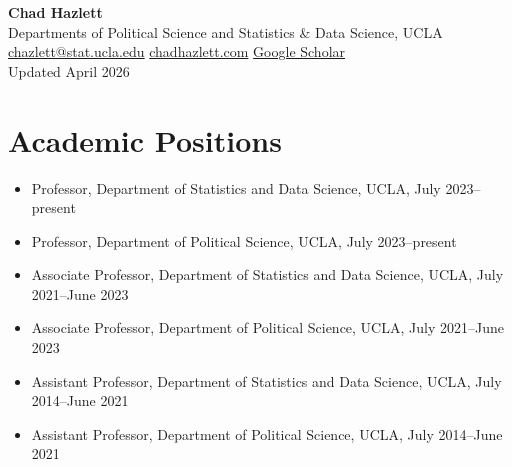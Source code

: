 \documentclass[11pt]{article}
\begin{document}
\begin{center}
  {\LARGE\sffamily\bfseries Chad Hazlett}\\[4pt]
  {\small Departments of Political Science and Statistics \& Data Science, UCLA}\\[3pt]
  {\small
    \href{mailto:chazlett@stat.ucla.edu}{chazlett@stat.ucla.edu}
    \quad\textbullet\quad
    \href{https://chadhazlett.com}{chadhazlett.com}
    \quad\textbullet\quad
    \href{https://scholar.google.com/citations?user=pbD0dGwAAAAJ}{Google Scholar}
  }\\[4pt]
  {\footnotesize\color{gray} Updated April 2026}
\end{center}

\vspace{0.5em}

\section{Academic Positions}
\begin{itemize}
\item Professor, Department of Statistics and Data Science, UCLA, July 2023--present
\item Professor, Department of Political Science, UCLA, July 2023--present
\item Associate Professor, Department of Statistics and Data Science, UCLA, July 2021--June 2023
\item Associate Professor, Department of Political Science, UCLA, July 2021--June 2023
\item Assistant Professor, Department of Statistics and Data Science, UCLA, July 2014--June 2021
\item Assistant Professor, Department of Political Science, UCLA, July 2014--June 2021
\end{itemize}

\end{document}
